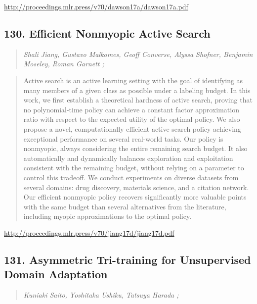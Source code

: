 \documentclass{article}
\begin{document}
\href{http://proceedings.mlr.press/v70/dawson17a/dawson17a.pdf}{http://proceedings.mlr.press/v70/dawson17a/dawson17a.pdf}

\subsection{130. Efficient Nonmyopic Active Search}

\begin{quote}
\footnotesize{\textit{Shali Jiang, Gustavo Malkomes, Geoff Converse, Alyssa Shofner, Benjamin Moseley, Roman Garnett ;}}

\end{quote}

\begin{quote}
    Active search is an active learning setting with the goal of identifying as many members of a given class as possible under a labeling budget. In this work, we first establish a theoretical hardness of active search, proving that no polynomial-time policy can achieve a constant factor approximation ratio with respect to the expected utility of the optimal policy. We also propose a novel, computationally efficient active search policy achieving exceptional performance on several real-world tasks. Our policy is nonmyopic, always considering the entire remaining search budget. It also automatically and dynamically balances exploration and exploitation consistent with the remaining budget, without relying on a parameter to control this tradeoff. We conduct experiments on diverse datasets from several domains: drug discovery, materials science, and a citation network. Our efficient nonmyopic policy recovers significantly more valuable points with the same budget than several alternatives from the literature, including myopic approximations to the optimal policy.  
\end{quote}

\href{http://proceedings.mlr.press/v70/jiang17d/jiang17d.pdf}{http://proceedings.mlr.press/v70/jiang17d/jiang17d.pdf}

\subsection{131. Asymmetric Tri-training for Unsupervised Domain Adaptation}

\begin{quote}
\footnotesize{\textit{Kuniaki Saito, Yoshitaka Ushiku, Tatsuya Harada ;}}

\end{quote}
\end{document}
